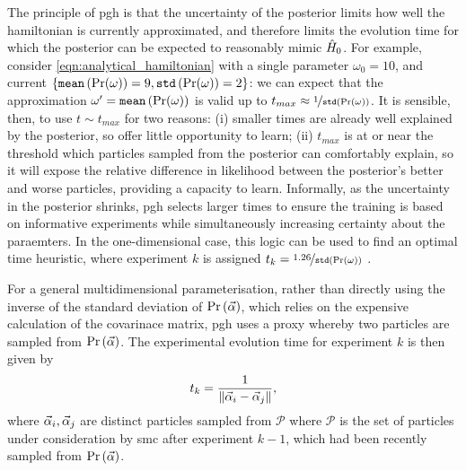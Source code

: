 The principle of \gls{pgh} is that the uncertainty of the posterior limits how well the \gls{hamiltonian} is currently 
    approximated\footnotemark, and therefore limits the evolution time for which the posterior can be expected to 
    reasonably mimic $\hat{H}_0$.
For example, consider \cref{eqn:analytical_hamiltonian} with a single parameter $\omega_0 = 10$,
    and current $\{\texttt{mean}\left(\Pr(\omega)\right) = 9, \texttt{std}\left(\Pr(\omega)\right) = 2\}$:
    we can expect that the approximation $\omega^{\prime} = \texttt{mean}\left(\Pr(\omega)\right)$ 
    is valid up to $t_{max} \approx \nicefrac{1}{\texttt{std}\left(\Pr(\omega)\right)}$. 
It is sensible, then, to use $t \sim t_{max}$ for two reasons: 
    (i) smaller times are already well explained by the posterior, so offer little opportunity to learn;
    (ii) $t_{max}$ is at or near the threshold which \glspl{particle} sampled from the posterior can comfortably explain, 
        so it will expose the relative difference in \gls{likelihood} between the posterior's better and worse \glspl{particle}, 
        providing a capacity to learn. 
Informally, as the uncertainty in the posterior shrinks, \gls{pgh} selects larger times 
    to ensure the training is based on informative \glspl{experiment} while 
    simultaneously increasing certainty about the paraemters. 
In the one-dimensional case, this logic can be used to find an optimal time heuristic, 
    where \gls{experiment} $k$ is assigned $t_k = \nicefrac{1.26}{\texttt{std}\left(\Pr(\omega)\right)}$ \cite{ferrie2013best}. 
\par
For a general multidimensional parameterisation, 
    rather than directly using the inverse of the standard deviation of $\Pr \left(\vec{\alpha}\right)$, 
    which relies on the expensive calculation of the covarinace matrix, 
    \gls{pgh} uses a proxy whereby two \glspl{particle} are sampled from $\Pr \left(\vec{\alpha}\right)$. 
The experimental evolution time for \gls{experiment} $k$ is then given by 
\begin{equation}
    \label{eqn:pgh_time}
    t_k = \frac{1}{\| \vec{\alpha}_i - \vec{\alpha}_j \|}, 
\end{equation}
    where $\vec{\alpha}_i, \vec{\alpha}_j$ are distinct \glspl{particle} sampled from $\mathcal{P}$ where 
    $\mathcal{P}$ is the set of \glspl{particle} under consideration by \gls{smc} after \gls{experiment} $k-1$, 
    which had been recently sampled from $\Pr\left(\vec{\alpha}\right)$. 
\par 


